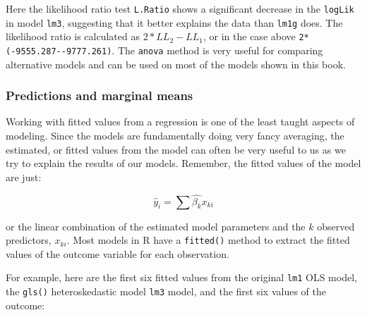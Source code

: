 \documentclass[
]{article}
\newenvironment{Shaded}{\begin{snugshade}}{\end{snugshade}}
\newcommand{\AttributeTok}[1]{\textcolor[rgb]{0.77,0.63,0.00}{#1}}
\newcommand{\FunctionTok}[1]{\textcolor[rgb]{0.00,0.00,0.00}{#1}}
\newcommand{\NormalTok}[1]{#1}
\newcommand{\OtherTok}[1]{\textcolor[rgb]{0.56,0.35,0.01}{#1}}
\newcommand{\SpecialCharTok}[1]{\textcolor[rgb]{0.00,0.00,0.00}{#1}}
\begin{document}
Here the likelihood ratio test \texttt{L.Ratio} shows a significant decrease in the \texttt{logLik} in model \texttt{lm3}, suggesting that it better explains the data than \texttt{lm1g} does. The likelihood ratio is calculated as \(2*LL_2 - LL_1\), or in the case above \texttt{2*(-9555.287-\/-9777.261)}. The \texttt{anova} method is very useful for comparing alternative models and can be used on most of the models shown in this book.

\hypertarget{predictions-and-marginal-means}{%
\subsubsection{Predictions and marginal means}\label{predictions-and-marginal-means}}

Working with fitted values from a regression is one of the least taught aspects of modeling. Since the models are fundamentally doing very fancy averaging, the estimated, or fitted values from the model can often be very useful to us as we try to explain the results of our models. Remember, the fitted values of the model are just:

\[
\hat{y}_i = \sum \hat{\beta_k} x_{ki}
\]

or the linear combination of the estimated model parameters and the \(k\) observed predictors, \(x_{ki}\). Most models in R have a \texttt{fitted()} method to extract the fitted values of the outcome variable for each observation.

For example, here are the first six fitted values from the original \texttt{lm1} OLS model, the \texttt{gls()} heteroskedastic model \texttt{lm3} model, and the first six values of the outcome:

\begin{Shaded}
\end{Shaded}
\end{document}
